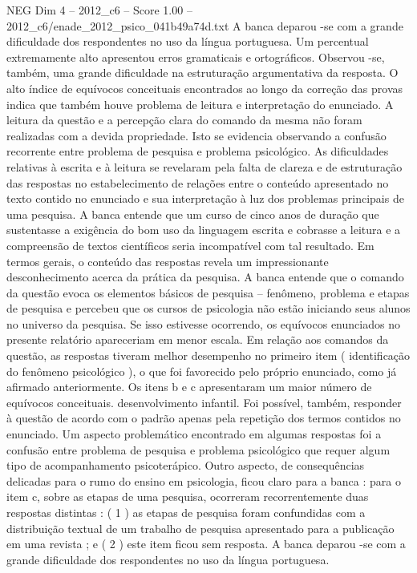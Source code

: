 \begin{textsample}{NEG Dim 4 – 2012\_c6 – Score 1.00 – 2012\_c6/enade\_2012\_psico\_041b49a74d.txt}
A banca deparou -se com a grande dificuldade dos respondentes no uso da língua portuguesa.
Um percentual extremamente alto apresentou erros gramaticais e ortográficos.
Observou -se, também, uma grande dificuldade na estruturação argumentativa da resposta.
O alto índice de equívocos conceituais encontrados ao longo da correção das provas indica que também houve problema de leitura e interpretação do enunciado.
A leitura da questão e a percepção clara do comando da mesma não foram realizadas com a devida propriedade.
Isto se evidencia observando a confusão recorrente entre problema de pesquisa e problema psicológico.
As dificuldades relativas à escrita e à leitura se revelaram pela falta de clareza e de estruturação das respostas no estabelecimento de relações entre o conteúdo apresentado no texto contido no enunciado e sua interpretação à luz dos problemas principais de uma pesquisa.
A banca entende que um curso de cinco anos de duração que sustentasse a exigência do bom uso da linguagem escrita e cobrasse a leitura e a compreensão de textos científicos seria incompatível com tal resultado.
Em termos gerais, o conteúdo das respostas revela um impressionante desconhecimento acerca da prática da pesquisa.
A banca entende que o comando da questão evoca os elementos básicos de pesquisa – fenômeno, problema e etapas de pesquisa e percebeu que os cursos de psicologia não estão iniciando seus alunos no universo da pesquisa.
Se isso estivesse ocorrendo, os equívocos enunciados no presente relatório apareceriam em menor escala.
Em relação aos comandos da questão, as respostas tiveram melhor desempenho no primeiro item ( identificação do fenômeno psicológico ), o que foi favorecido pelo próprio enunciado, como já afirmado anteriormente.
Os itens b e c apresentaram um maior número de equívocos conceituais. desenvolvimento infantil.
Foi possível, também, responder à questão de acordo com o padrão apenas pela repetição dos termos contidos no enunciado.
Um aspecto problemático encontrado em algumas respostas foi a confusão entre problema de pesquisa e problema psicológico que requer algum tipo de acompanhamento psicoterápico.
Outro aspecto, de consequências delicadas para o rumo do ensino em psicologia, ficou claro para a banca : para o item c, sobre as etapas de uma pesquisa, ocorreram recorrentemente duas respostas distintas : ( 1 ) as etapas de pesquisa foram confundidas com a distribuição textual de um trabalho de pesquisa apresentado para a publicação em uma revista ; e ( 2 ) este item ficou sem resposta.
A banca deparou -se com a grande dificuldade dos respondentes no uso da língua portuguesa.

\end{textsample}
